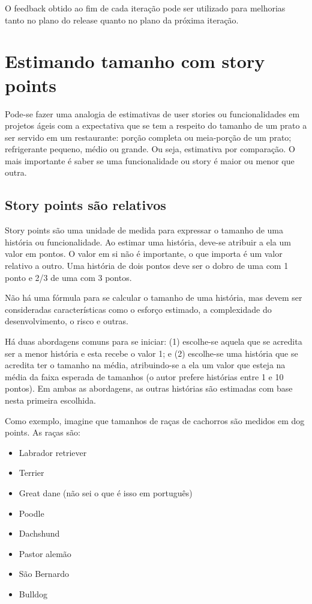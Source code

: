 \documentclass[a4paper,abntfigtabnum,noindentfirst]{abnt}
\begin{document}
O feedback obtido ao fim de cada iteração pode ser utilizado para melhorias tanto no plano do release quanto no plano da próxima iteração.


\chapter{Estimando tamanho com story points}

Pode-se fazer uma analogia de estimativas de user stories ou funcionalidades em projetos ágeis com a expectativa que se tem a respeito do tamanho de um prato a ser servido em um restaurante: porção completa ou meia-porção de um prato; refrigerante pequeno, médio ou grande. Ou seja, estimativa por comparação. O mais importante é saber se uma funcionalidade ou story é maior ou menor que outra.

\section{Story points são relativos}

Story points são uma unidade de medida para expressar o tamanho de uma história ou funcionalidade. Ao estimar uma história, deve-se atribuir a ela um valor em pontos. O valor em si não é importante, o que importa é um valor relativo a outro. Uma história de dois pontos deve ser o dobro de uma com 1 ponto e 2/3 de uma com 3 pontos.

Não há uma fórmula para se calcular o tamanho de uma história, mas devem ser consideradas características como o esforço estimado, a complexidade do desenvolvimento, o risco e outras.

Há duas abordagens comuns para se iniciar: (1) escolhe-se aquela que se acredita ser a menor história e esta recebe o valor 1; e (2) escolhe-se uma história que se acredita ter o tamanho na média, atribuindo-se a ela um valor que esteja na média da faixa esperada de tamanhos (o autor prefere histórias entre 1 e 10 pontos). Em ambas as abordagens, as outras histórias são estimadas com base nesta primeira escolhida.

Como exemplo, imagine que tamanhos de raças de cachorros são medidos em dog points. As raças são:
\begin{itemize}
\item Labrador retriever
\item Terrier
\item Great dane (não sei o que é isso em português)
\item Poodle
\item Dachshund
\item Pastor alemão
\item São Bernardo
\item Bulldog
\end{itemize}
\end{document}
